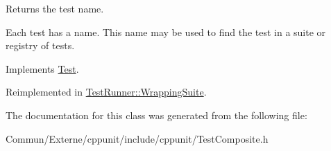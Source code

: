 Returns the test name. 

Each test has a name. This name may be used to find the test in a suite or registry of tests. 

Implements \hyperlink{class_test_a5249569313f295a622580ffd99c9d816}{Test}.



Reimplemented in \hyperlink{class_test_runner_1_1_wrapping_suite_a500c7e2413a4830b87d8ab061251f856}{Test\+Runner\+::\+Wrapping\+Suite}.



The documentation for this class was generated from the following file\+:\begin{DoxyCompactItemize}
\item 
Commun/\+Externe/cppunit/include/cppunit/Test\+Composite.\+h\end{DoxyCompactItemize}
